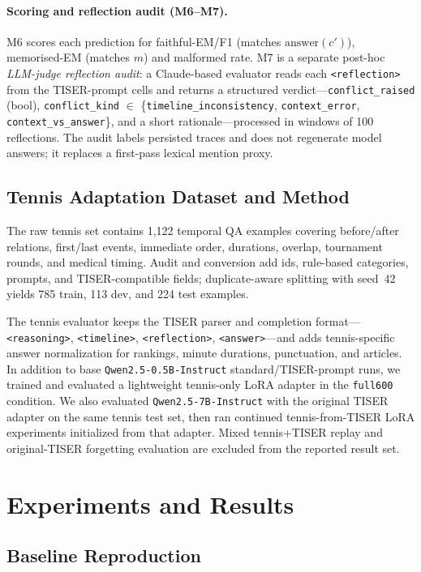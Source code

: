 \documentclass[conference]{IEEEtran}
\begin{document}
\paragraph{Scoring and reflection audit (M6--M7).}
M6 scores each prediction for faithful-EM/F1 (matches $\text{answer}(c')$), memorised-EM (matches $m$) and malformed rate. M7 is a separate post-hoc \emph{LLM-judge reflection audit}: a Claude-based evaluator reads each \texttt{<reflection>} from the TISER-prompt cells and returns a structured verdict---\texttt{conflict\_raised} (bool), \texttt{conflict\_kind} $\in$ \{\texttt{timeline\_inconsistency}, \texttt{context\_error}, \texttt{context\_vs\_answer}\}, and a short rationale---processed in windows of 100 reflections. The audit labels persisted traces and does not regenerate model answers; it replaces a first-pass lexical mention proxy.

\subsection{Tennis Adaptation Dataset and Method}

The raw tennis set contains 1,122 temporal QA examples covering before/after relations, first/last events, immediate order, durations, overlap, tournament rounds, and medical timing. Audit and conversion add ids, rule-based categories, prompts, and TISER-compatible fields; duplicate-aware splitting with seed~42 yields 785 train, 113 dev, and 224 test examples.

The tennis evaluator keeps the TISER parser and completion format---\texttt{<reasoning>}, \texttt{<timeline>}, \texttt{<reflection>}, \texttt{<answer>}---and adds tennis-specific answer normalization for rankings, minute durations, punctuation, and articles. In addition to base \texttt{Qwen2.5-0.5B-Instruct} standard/TISER-prompt runs, we trained and evaluated a lightweight tennis-only LoRA adapter in the \texttt{full600} condition. We also evaluated \texttt{Qwen2.5-7B-Instruct} with the original TISER adapter on the same tennis test set, then ran continued tennis-from-TISER LoRA experiments initialized from that adapter. Mixed tennis+TISER replay and original-TISER forgetting evaluation are excluded from the reported result set.

\section{Experiments and Results}

\subsection{Baseline Reproduction}
\end{document}
